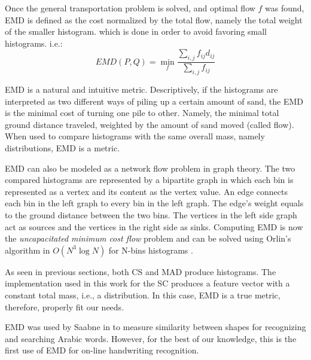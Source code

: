 \iftoggle{edit-mode}{\hspace{0pt}\marginpar{EMD definition}}{}
Once the general transportation problem is solved, and optimal flow $f$ was found, EMD is defined as the cost normalized by the total flow, namely the total weight of the smaller histogram. which is done in order to avoid favoring small histograms. i.e.:
\begin{equation}
EMD(P,Q)=\min\limits_{f} {\frac{\sum_{i,j} f_{ij}d_{ij}}{\sum_{i,j} f_{ij}}}
\end{equation} 

EMD is a natural and intuitive metric. Descriptively, if the histograms are interpreted as two different ways of piling up a certain amount of sand, the EMD is the minimal cost of turning one pile to other. Namely, the minimal total ground distance traveled, weighted by the amount of sand moved (called flow). When used to compare histograms with the same overall mass, namely distributions, EMD is a metric.

\iftoggle{edit-mode}{\hspace{0pt}\marginpar{EMD modeling as flow in graph}}{}
EMD can also be modeled as a network flow problem in graph theory. The two compared histograms are represented by a bipartite graph in which each bin is represented as a vertex and its content as the vertex value. An edge connects each bin in the left graph to every bin in the left graph. The edge's weight equals to the ground distance between the two bins. The vertices in the left side graph act as sources and the vertices in the right side as sinks. Computing EMD is now the \emph{uncapacitated minimum cost flow} problem and can be solved using Orlin's algorithm in $O(N^3 \log N)$ for N-bins histograms \cite{shirdhonkar2008approximate}.

\iftoggle{edit-mode}{\hspace{0pt}\marginpar{EMD in Feature space}}{}
As seen in previous sections, both CS and MAD produce histograms. The implementation used in this work for the SC produces a feature vector with a constant total mass, i.e., a distribution. In this case, EMD is a true metric, therefore, properly fit our needs.

\iftoggle{edit-mode}{\hspace{0pt}\marginpar{EMD in handwriting recognition}}{}
EMD was used by Saabne in \cite{saabni2013efficient} to measure similarity between shapes for recognizing and searching Arabic words. However, for the best of our knowledge, this is the first use of EMD for on-line handwriting recognition.

